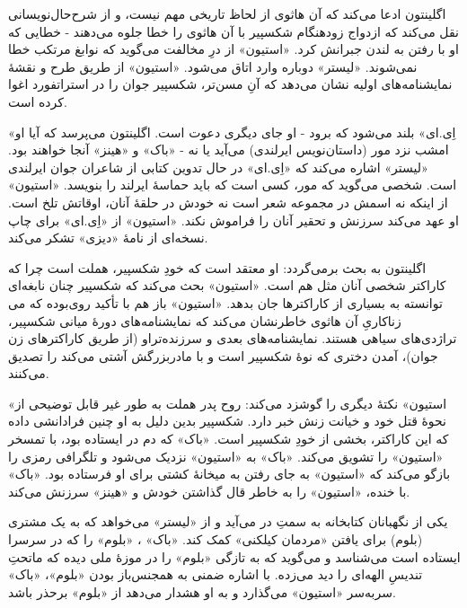\documentclass[12pt]{book}
\newcommand{\noun}[1]{«{#1}»}
\begin{document}
    اگلینتون ادعا می‌کند که آن هاثوی از لحاظ تاریخی مهم نیست، و از شرح‌حال‌نویسانی نقل می‌کند که ازدواج زودهنگام شکسپیر با آن هاثوی را خطا جلوه می‌دهند - خطایی که او با رفتن به لندن جبرانش کرد. \noun{استیون} از درِ مخالفت می‌گوید که نوابغ مرتکب خطا نمی‌شوند. \noun{لیستر} دوباره وارد اتاق می‌شود. \noun{استیون} از طریق طرح و نقشۀ نمایشنامه‌های اولیه نشان می‌دهد که آنِ مسن‌تر، شکسپیر جوان را در استراتفورد اغوا کرده است.

    \noun{اِی.ای} بلند می‌شود که برود - او جای دیگری دعوت است. اگلینتون می‌پرسد که آیا او امشب نزد مور (داستان‌نویس ایرلندی) می‌آید یا نه - \noun{باک}  و \noun{هینز}  آنجا خواهند بود. \noun{لیستر} اشاره می‌کند که \noun{اِی.ای} در حال تدوین کتابی از شاعران جوان ایرلندی است. شخصی می‌گوید که مور، کسی است که باید حماسۀ ایرلند را بنویسد. \noun{استیون} از اینکه نه اسمش در مجموعه شعر است نه خودش در حلقۀ آنان، اوقاتش تلخ است. او عهد می‌کند سرزنش و تحقیر آنان را فراموش نکند. \noun{استیون} از \noun{اِی.ای} برای چاپ نسخه‌ای از نامۀ \noun{دیزی} تشکر می‌کند.

    اگلینتون به بحث برمی‌گردد: او معتقد است که خودِ شکسپیر، هملت است چرا که کاراکتر شخصی آنان مثل هم است. \noun{استیون} بحث می‌کند که شکسپیر چنان نابغه‌ای بوده که می‎‌توانسته به بسیاری از کاراکترها جان بدهد. \noun{استیون} باز هم با تأکید روی زناکاریِ آن هاثوی خاطرنشان می‌کند که نمایشنامه‌های دورۀ میانی شکسپیر، تراژدی‌های سیاهی هستند. نمایشنامه‌های بعدی و سرزنده‌تراو (از طریق کاراکترهای زن جوان)، آمدن دختری که نوۀ شکسپیر است و با مادربزرگش آشتی می‌کند را تصدیق می‌کنند.

    \noun{استیون} نکتۀ دیگری را گوشزد می‌کند: روح پدر هملت به طور غیر قابل توضیحی از نحوۀ قتل خود و خیانت زنش خبر دارد. شکسپیر بدین دلیل به او چنین فرادانشی داده که این کاراکتر، بخشی از خودِ شکسپیر است. \noun{باک}  که دم در ایستاده بود، با تمسخر \noun{استیون} را تشویق می‌کند. \noun{باک}  به \noun{استیون} نزدیک می‌شود و تلگرافی رمزی را بازگو می‌کند که \noun{استیون} به جای رفتن به میخانۀ کشتی برای او فرستاده بود. \noun{باک}  با خنده، \noun{استیون} را به خاطر قال گذاشتن خودش و \noun{هینز}  سرزنش می‌کند.

    یکی از نگهبانان کتابخانه به سمتِ در می‌آید و از \noun{لیستر} می‌خواهد که به یک مشتری (بلوم) برای یافتن «مردمان کیلکنی» کمک کند. \noun{باک} ، \noun{بلوم} را که در سرسرا ایستاده است می‌شناسد و می‌گوید که به تازگی \noun{بلوم} را در موزۀ ملی دیده که ماتحتِ تندیسِ الهه‌ای را دید می‌زده. با اشاره ضمنی به همجنس‌باز بودن \noun{بلوم}، \noun{باک}  سربه‌سر \noun{استیون} می‌گذارد و به او هشدار می‌دهد از \noun{بلوم} برحذر باشد.
\end{document}
